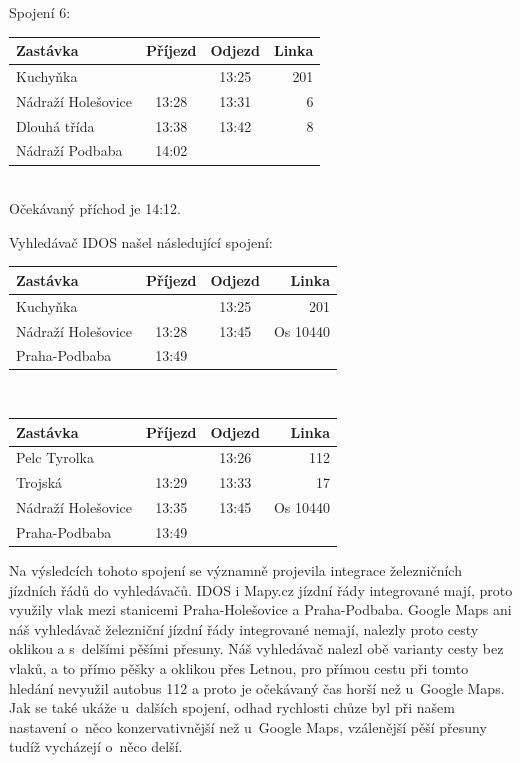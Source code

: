 Spojení 6:\\[2mm]
\begin{tabular}{|l|c|c|r|}\hline
{\bf Zastávka}&{\bf Příjezd}&{\bf Odjezd}&{\bf Linka}\\\hline
Kuchyňka&&13:25&201\\\hline
Nádraží Holešovice&13:28&13:31&6\\\hline
Dlouhá třída&13:38&13:42&8\\\hline
Nádraží Podbaba&14:02&&\\\hline
\end{tabular}\\[2mm]
Očekávaný příchod je 14:12. 


Vyhledávač IDOS našel následující spojení:\\
\begin{tabular}{|l|c|c|r|}\hline
{\bf Zastávka}&{\bf Příjezd}&{\bf Odjezd}&{\bf Linka}\\\hline
Kuchyňka&&13:25&201\\\hline
Nádraží Holešovice&13:28&13:45&Os 10440\\\hline
Praha-Podbaba&13:49&&\\\hline
\end{tabular}\\
\begin{tabular}{|l|c|c|r|}\hline
{\bf Zastávka}&{\bf Příjezd}&{\bf Odjezd}&{\bf Linka}\\\hline
Pelc Tyrolka&&13:26&112\\\hline
Trojská&13:29&13:33&17\\\hline
Nádraží Holešovice&13:35&13:45&Os 10440\\\hline
Praha-Podbaba&13:49&&\\\hline
\end{tabular} 

Na výsledcích tohoto spojení se významně projevila integrace železničních
jízdních řádů do vyhledávačů. IDOS i Mapy.cz jízdní řády integrované mají,
proto využily vlak mezi stanicemi Praha-Holešovice a Praha-Podbaba. Google Maps
ani náš vyhledávač železniční jízdní řády integrované nemají, nalezly proto
cesty oklikou a s~delšími pěšími přesuny. Náš vyhledávač nalezl obě varianty
cesty bez vlaků, a to přímo pěšky a oklikou přes Letnou, pro přímou cestu při
tomto hledání nevyužil autobus 112 a proto je očekávaný čas horší než u~Google
Maps. Jak se také ukáže u~dalších spojení, odhad rychlosti chůze byl při našem
nastavení o~něco konzervativnější než u~Google Maps, vzálenější pěší přesuny
tudíž vycházejí o~něco delší.


